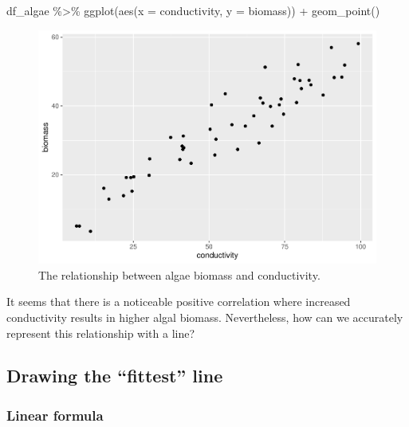 \documentclass[
]{article}
\newenvironment{Shaded}{\begin{snugshade}}{\end{snugshade}}
\newcommand{\AttributeTok}[1]{\textcolor[rgb]{0.77,0.63,0.00}{#1}}
\newcommand{\FunctionTok}[1]{\textcolor[rgb]{0.00,0.00,0.00}{#1}}
\newcommand{\NormalTok}[1]{#1}
\newcommand{\SpecialCharTok}[1]{\textcolor[rgb]{0.00,0.00,0.00}{#1}}
\begin{document}
\begin{Shaded}
\begin{Highlighting}[]
\NormalTok{df\_algae }\SpecialCharTok{\%\textgreater{}\%} 
  \FunctionTok{ggplot}\NormalTok{(}\FunctionTok{aes}\NormalTok{(}\AttributeTok{x =}\NormalTok{ conductivity,}
             \AttributeTok{y =}\NormalTok{ biomass)) }\SpecialCharTok{+}
  \FunctionTok{geom\_point}\NormalTok{()}
\end{Highlighting}
\end{Shaded}

\begin{figure}

{\centering \includegraphics{biostats_files/figure-latex/scatter-1} 

}

\caption{The relationship between algae biomass and conductivity.}\label{fig:scatter}
\end{figure}

It seems that there is a noticeable positive correlation where increased conductivity results in higher algal biomass. Nevertheless, how can we accurately represent this relationship with a line?

\hypertarget{drawing-the-fittest-line}{%
\subsection{Drawing the ``fittest'' line}\label{drawing-the-fittest-line}}

\hypertarget{linear-formula}{%
\subsubsection{Linear formula}\label{linear-formula}}
\end{document}
